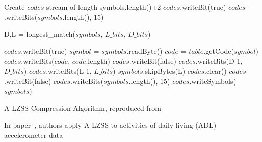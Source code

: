 \begin{algorithm}
\begin{algorithmic}[1]
\Input
\EndInput
\Output
\EndOutput

\State Create $codes$ stream of length symbols.length()+2   
\State $codes$.writeBit(true)   
\State $codes$.writeBits($symbols$.length(), 15)    

   
    \State D,L = longest\_match($symbols$, $L\_bits$, $D\_bits$) 
    
      
        \State $codes$.writeBit(true)   
        \State $symbol$ = $symbols$.readByte()  
        \State $code$ = $table$.getCode($symbol$)   
        \State $codes$.writeBits($code$, $code$.length)
    \Else   {}
        \State $codes$.writeBit(false)  
        \State $codes$.writeBits(D-1, $D\_bits$)    
        \State $codes$.writeBits(L-1, $L\_bits$)
        \State $symbols$.skipBytes(L)   
    \EndIf
\EndWhile
{}  
    \State $codes$.clear()
    \State $codes$.writeBit(false)
    \State $codes$.writeBits($symbols$.length(), 15)
    \State $codes$.writeSymbols($symbols$) 
\EndIf
\end{algorithmic}
\caption{A-LZSS Compression Algorithm, reproduced from~\cite{pope2018accelerometer}}
\label{algo:A-LZSS}
\end{algorithm}

In paper~\cite{pope2018accelerometer}, authors apply A-LZSS to activities of
daily living (ADL)~\cite{jackson1963studies} accelerometer data 

